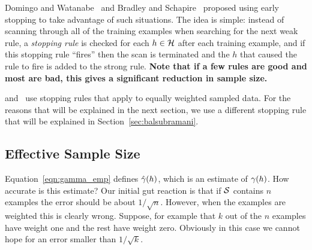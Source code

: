 Domingo and Watanabe~\cite{domingo_scaling_2000} and Bradley and
Schapire~\cite{bradley_filterboost:_2007} proposed using early
stopping to take advantage of such situations. The idea is simple:
instead of scanning through all of the training examples when
searching for the next weak rule, a {\em stopping rule} is checked for
each $h \in \mathcal{H}$ after each training example, and if this stopping
rule ``fires'' then the scan is terminated and the $h$ that caused the
rule to fire is added to the strong rule.
{\bf Note that if a few rules are good and most are bad, this gives a
  significant reduction in sample size.}

\cite{bradley_filterboost:_2007} and~\cite{domingo_scaling_2000}
use stopping rules that apply to equally weighted sampled
data. For the reasons that will be explained in the next section, we use a different
 stopping rule that will be explained in
 Section~\ref{sec:balsubramani}.


\subsection{Effective Sample Size}
\label{sec:effectiveSampleSize}
Equation~\ref{eqn:gamma_emp} defines $\hat{\gamma}(h)$, which is an
estimate of $\gamma(h)$. How accurate is this estimate? Our initial
gut reaction is that if ${\cal S}$ contains $n$ examples the error should be
about $1/\sqrt{n}$. However, when the examples are weighted this is
clearly wrong. Suppose, for example that $k$ out of the $n$ examples
have weight one and the rest have weight zero. Obviously in this case
we cannot hope for an error smaller than $1/\sqrt{k}$.

